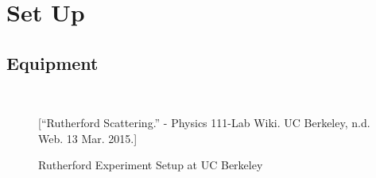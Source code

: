 \section{Set Up}
\subsection{Equipment}

\begin{figure}[htp]
  \begin{center}
     \\
  \end{center}
  \caption{Rutherford Experiment Setup at UC Berkeley}[\footnotesize{``Rutherford Scattering.'' - Physics 111-Lab Wiki. UC Berkeley, n.d. Web. 13 Mar. 2015.}]
  \label{ThreeFigs}
\end{figure}

